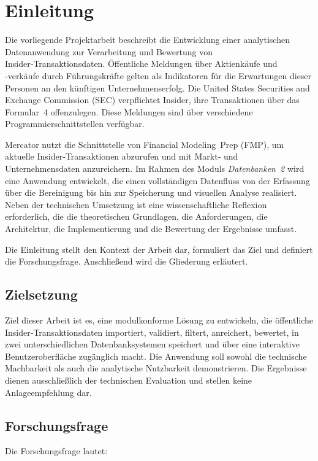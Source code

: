 \section{Einleitung}

Die vorliegende Projektarbeit beschreibt die Entwicklung einer analytischen Datenanwendung zur Verarbeitung und Bewertung von Insider‑Transaktionsdaten. Öffentliche Meldungen über Aktienkäufe und ‑verkäufe durch Führungskräfte gelten als Indikatoren für die Erwartungen dieser Personen an den künftigen Unternehmenserfolg. Die United States Securities and Exchange Commission (SEC) verpflichtet Insider, ihre Transaktionen über das Formular~4 offenzulegen. Diese Meldungen sind über verschiedene Programmierschnittstellen verfügbar.

Mercator nutzt die Schnittstelle von Financial Modeling Prep (FMP), um aktuelle Insider‑Transaktionen abzurufen und mit Markt‑ und Unternehmensdaten anzureichern. Im Rahmen des Moduls \emph{Datenbanken 2} wird eine Anwendung entwickelt, die einen vollständigen Datenfluss von der Erfassung über die Bereinigung bis hin zur Speicherung und visuellen Analyse realisiert. Neben der technischen Umsetzung ist eine wissenschaftliche Reflexion erforderlich, die die theoretischen Grundlagen, die Anforderungen, die Architektur, die Implementierung und die Bewertung der Ergebnisse umfasst.

Die Einleitung stellt den Kontext der Arbeit dar, formuliert das Ziel und definiert die Forschungsfrage. Anschließend wird die Gliederung erläutert.

\subsection{Zielsetzung}

Ziel dieser Arbeit ist es, eine modulkonforme Lösung zu entwickeln, die öffentliche Insider‑Transaktionsdaten importiert, validiert, filtert, anreichert, bewertet, in zwei unterschiedlichen Datenbanksystemen speichert und über eine interaktive Benutzeroberfläche zugänglich macht. Die Anwendung soll sowohl die technische Machbarkeit als auch die analytische Nutzbarkeit demonstrieren. Die Ergebnisse dienen ausschließlich der technischen Evaluation und stellen keine Anlageempfehlung dar.

\subsection{Forschungsfrage}

Die Forschungsfrage lautet:

